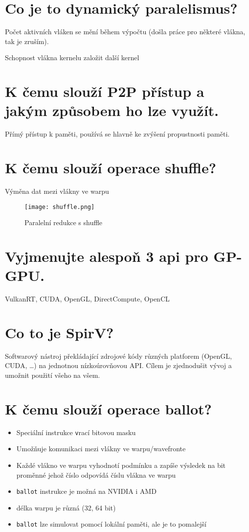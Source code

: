 \section{Co je to dynamický paralelismus?}
	Počet aktivních vláken se mění během výpočtu (došla práce pro některé vlákna, tak je zruším).
	
	Schopnost vlákna kernelu založit další kernel
	



\section{K čemu slouží P2P přístup a jakým způsobem ho lze využít.}
	Přímý přístup k paměti, používá se hlavně ke zvýšení propustnosti paměti.
	

\section{K čemu slouží operace shuffle?}
	Výměna dat mezi vlákny ve warpu
	\begin{figure}[h]
		\centering
		\texttt{[image: shuffle.png]}
		\caption{Paralelní redukce s shuffle}
		\label{fig:shuffle}
	\end{figure}


\section{Vyjmenujte alespoň 3 api pro GP-GPU.}
	VulkanRT, CUDA, OpenGL, DirectCompute, OpenCL


\section{Co to je SpirV?}
	Softwarový nástroj překládající zdrojové kódy různých platforem (OpenGL, CUDA, \dots) na jednotnou nízkoúrovňovou API. Cílem je zjednodušit vývoj a umožnit použití všeho na všem.
	

\section{K čemu slouží operace ballot?}
	\begin{itemize}
		\setlength\itemsep{0em}
		\item Speciální instrukce \texttt vrací bitovou masku
		\item Umožňuje komunikaci mezi vlákny ve warpu/wavefronte
		\item Každé vlákno ve warpu vyhodnotí podmínku a zapíše	výsledek na bit proměnné jehož číslo odpovídá číslu vlákna ve warpu
		\item \texttt{ballot} instrukce je možná na NVIDIA i AMD
		\item délka warpu je různá (32, 64 bit)
		\item \texttt{ballot} lze simulovat pomocí lokální paměti, ale je to pomalejší
	\end{itemize}


